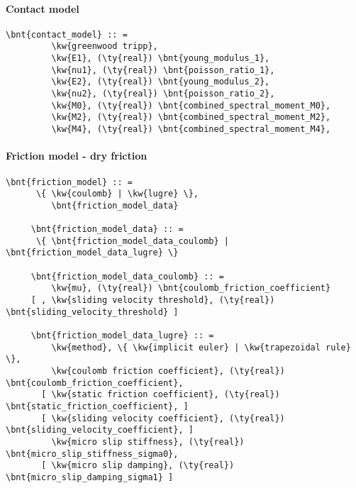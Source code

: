 \paragraph{Contact model}
\begin{Verbatim}[commandchars=\\\{\}]
     \bnt{contact_model} :: =
         \kw{greenwood tripp},
         \kw{E1}, (\ty{real}) \bnt{young_modulus_1},
         \kw{nu1}, (\ty{real}) \bnt{poisson_ratio_1},
         \kw{E2}, (\ty{real}) \bnt{young_modulus_2},
         \kw{nu2}, (\ty{real}) \bnt{poisson_ratio_2},
         \kw{M0}, (\ty{real}) \bnt{combined_spectral_moment_M0},
         \kw{M2}, (\ty{real}) \bnt{combined_spectral_moment_M2},
         \kw{M4}, (\ty{real}) \bnt{combined_spectral_moment_M4},
\end{Verbatim}
\paragraph{Friction model - dry friction}
\begin{Verbatim}[commandchars=\\\{\}]
     \bnt{friction_model} :: =
      \{ \kw{coulomb} | \kw{lugre} \},
         \bnt{friction_model_data}

     \bnt{friction_model_data} :: =
      \{ \bnt{friction_model_data_coulomb} | \bnt{friction_model_data_lugre} \}

     \bnt{friction_model_data_coulomb} :: =
         \kw{mu}, (\ty{real}) \bnt{coulomb_friction_coefficient}
     [ , \kw{sliding velocity threshold}, (\ty{real}) \bnt{sliding_velocity_threshold} ]

     \bnt{friction_model_data_lugre} :: =
         \kw{method}, \{ \kw{implicit euler} | \kw{trapezoidal rule} \},
         \kw{coulomb friction coefficient}, (\ty{real}) \bnt{coulomb_friction_coefficient},
       [ \kw{static friction coefficient}, (\ty{real}) \bnt{static_friction_coefficient}, ]
       [ \kw{sliding velocity coefficient}, (\ty{real}) \bnt{sliding_velocity_coefficient}, ]
         \kw{micro slip stiffness}, (\ty{real}) \bnt{micro_slip_stiffness_sigma0},
       [ \kw{micro slip damping}, (\ty{real}) \bnt{micro_slip_damping_sigma1} ]
\end{Verbatim}
